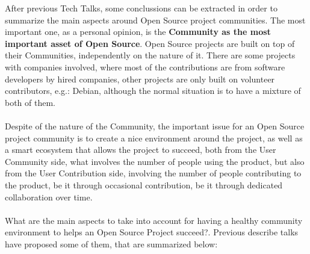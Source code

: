 \documentclass[11pt]{article}
\begin{document}
After previous Tech Talks, some conclussions can be extracted in order to summarize the main aspects around Open Source project communities. The most important one, as a personal opinion, is the \textbf{Community as the most important asset of Open Source}. Open Source projects are built on top of their Communities, independently on the nature of it. There are some projects with companies involved, where most of the contributions are from software developers by hired companies, other projects are only built on volunteer contributors, e.g.: Debian, although the normal situation is to have a mixture of both of them.\\
\\
Despite of the nature of the Community, the important issue for an Open Source project community is to create a nice environment around the project, as well as a smart ecosystem that allows the project to succeed, both from the User Community side, what involves the number of people using the product, but also from the User Contribution side, involving the number of people contributing to the product, be it through occasional contribution, be it through dedicated collaboration over time.\\
\\
What are the main aspects to take into account for having a healthy community environment to helps an Open Source Project succeed?. Previous describe talks have proposed some of them, that are summarized below:
\end{document}

